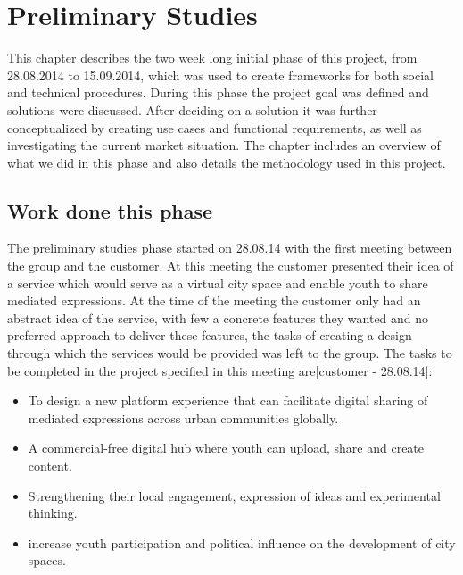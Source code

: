 \chapter{Preliminary Studies}
\label{chap:Prelim}

This chapter describes the two week long initial phase of this project, from 28.08.2014 to 15.09.2014, which was used to create frameworks for both social and technical procedures. During this phase the project goal was defined and solutions were discussed. After deciding on a solution it was further conceptualized by creating use cases and functional requirements, as well as investigating the current market situation. The chapter includes an overview of what we did in this phase and also details the methodology used in this project.

\section{Work done this phase}
\label{sec:PrelimWork}
The preliminary studies phase started on 28.08.14 with the first meeting between the group and the customer. At this meeting the customer presented their idea of a service which would serve as a virtual city space and enable youth to share mediated expressions. At the time of the meeting the customer only had an abstract idea of the service, with few a concrete features they wanted and no preferred approach to deliver these features, the tasks of creating a design through which the services would be provided was left to the group. The tasks to be completed in the project specified in this meeting are[customer - 28.08.14]:
\begin{itemize}
  \item To design a new platform experience that can facilitate digital sharing of mediated expressions across urban communities globally.
  \item A commercial-free digital hub where youth can upload, share and create content.
  \item Strengthening their local engagement, expression of ideas and experimental thinking.
  \item increase youth participation and political influence on the development of city spaces.
\end{itemize}

